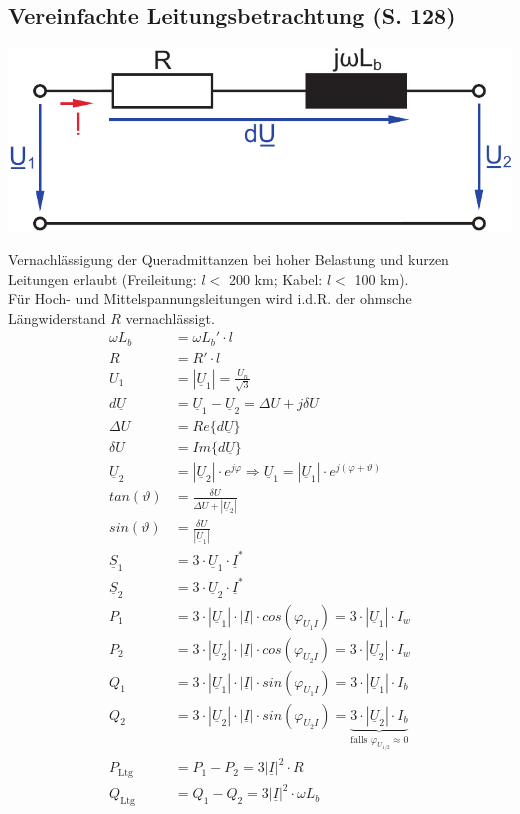 \documentclass[a4paper,twocolumn,10pt]{article}
\begin{document}
\subsection{Vereinfachte Leitungsbetrachtung (S. 128)}
\begin{center}
\includegraphics[width=0.8\columnwidth]{Grafiken/Uebertragungsleitung}
\end{center}
Vernachlässigung der Queradmittanzen bei hoher Belastung und kurzen Leitungen erlaubt (Freileitung: $l<$ 200 km; Kabel: $l<$ 100 km).\\
Für Hoch- und Mittelspannungsleitungen wird i.d.R. der ohmsche Längwiderstand $R$ vernachlässigt.
\begin{equation*}
\begin{split}
\omega L_b&=\omega L_b'\cdot l\\
R&=R'\cdot l\\
U_1&=|\underline{U}_1|=\frac{U_n}{\sqrt{3}}\\
d\underline{U}&=\underline{U}_1-\underline{U}_2=\Delta U+j\delta U\\
\Delta U&=Re\{d\underline{U}\}\\
\delta U&=Im\{d\underline{U}\}\\
\underline{U}_2&=|\underline{U}_2|\cdot e^{j\varphi}\Rightarrow \underline{U}_1=|\underline{U}_1|\cdot e^{j(\varphi+\vartheta)}\\
tan(\vartheta)&=\frac{\delta U}{\Delta U+|\underline{U}_2|}\\
sin(\vartheta)&=\frac{\delta U}{|\underline{U}_1|}\\
\underline{S}_1&=3\cdot\underline{U}_1\cdot\underline{I}^*\\
\underline{S}_2&=3\cdot\underline{U}_2\cdot\underline{I}^*\\
P_1&=3\cdot|\underline{U}_1|\cdot |\underline{I}|\cdot cos(\varphi_{U_1I})=3\cdot |\underline{U}_1|\cdot I_w\\
P_2&=3\cdot|\underline{U}_2|\cdot |\underline{I}|\cdot cos(\varphi_{U_2I})=3\cdot |\underline{U}_2|\cdot I_w\\
Q_1&=3\cdot|\underline{U}_1|\cdot |\underline{I}|\cdot sin(\varphi_{U_1I})=3\cdot |\underline{U}_1|\cdot I_b\\
Q_2&=3\cdot|\underline{U}_2|\cdot |\underline{I}|\cdot sin(\varphi_{U_2I})=\underbrace{3\cdot |\underline{U}_2|\cdot I_b}_{\text{falls } \varphi_{U_{1/2}}\approx 0}\\
P_{\text{Ltg}}&=P_1-P_2=3|\underline{I}|^2\cdot R\\
Q_{\text{Ltg}}&=Q_1-Q_2=3|\underline{I}|^2\cdot \omega L_b
\end{split}
\end{equation*}
\end{document}
